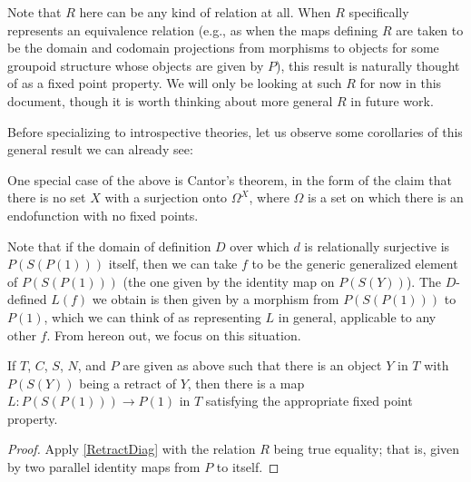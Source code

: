 Note that $R$ here can be any kind of relation at all. When $R$ specifically represents an equivalence relation (e.g., as when the maps defining $R$ are taken to be the domain and codomain projections from morphisms to objects for some groupoid structure whose objects are given by $P$), this result is naturally thought of as a fixed point property. We will only be looking at such $R$ for now in this document, though it is worth thinking about more general $R$ in future work.

Before specializing to introspective theories, let us observe some corollaries of this general result we can already see:

\begin{observation}\label{CantorsTheorem}
One special case of the above is Cantor's theorem, in the form of the claim that there is no set $X$ with a surjection onto $\Omega^X$, where $\Omega$ is a set on which there is an endofunction with no fixed points. 
\end{observation}

\begin{corollary}\label{RetractDiag}
Note that if the domain of definition $D$ over which $d$ is relationally surjective is $P(S(P(1)))$ itself, then we can take $f$ to be the generic generalized element of $P(S(P(1)))$ (the one given by the identity map on $P(S(Y))$). The $D$-defined $L(f)$ we obtain is then given by a morphism from $P(S(P(1)))$ to $P(1)$, which we can think of as representing $L$ in general, applicable to any other $f$. From hereon out, we focus on this situation. 
\end{corollary}

\begin{corollary}\label{RetractInT}
If $T$, $C$, $S$, $N$, and $P$ are given as above such that there is an object $Y$ in $T$ with $P(S(Y))$ being a retract of $Y$, then there is a map $L : P(S(P(1))) \to P(1)$ in $T$ satisfying the appropriate fixed point property.
\end{corollary}
\begin{proof}
Apply \cref{RetractDiag} with the relation $R$ being true equality; that is, given by two parallel identity maps from $P$ to itself.
\end{proof}


